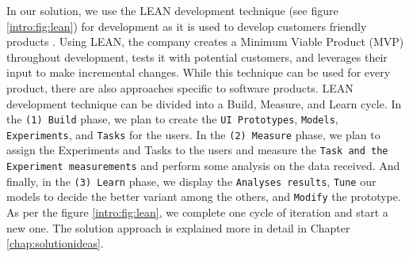 In our solution, we use the LEAN development technique (see figure \ref{intro:fig:lean}) for development as it is used to develop customers friendly products \cite{article:lean:hart}.
Using LEAN, the company creates a Minimum Viable Product (MVP) throughout development, tests it with potential customers, and leverages their input to make incremental changes.
While this technique can be used for every product, there are also approaches specific to software products.
LEAN development technique can be divided into a Build, Measure, and Learn cycle. 
In the \texttt{(1) Build} phase, we plan to create the \texttt{UI Prototypes}, \texttt{Models}, \texttt{Experiments}, and \texttt{Tasks} for the users.
In the \texttt{(2) Measure} phase, we plan to assign the Experiments and Tasks to the users and measure the \texttt{Task and the Experiment measurements} and perform some analysis on the data received. 
And finally, in the \texttt{(3) Learn} phase, we display the \texttt{Analyses results}, \texttt{Tune} our models to decide the better variant among the others, and \texttt{Modify} the prototype.
As per the figure \ref{intro:fig:lean}, we complete one cycle of iteration and start a new one.
The solution approach is explained more in detail in Chapter \ref{chap:solutionideas}.



